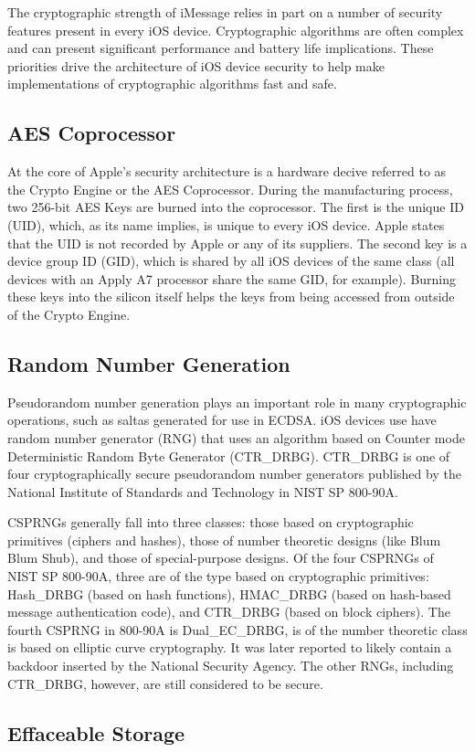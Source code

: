 The cryptographic strength of iMessage relies in part on a number of security
features present in every iOS device. Cryptographic algorithms are often
complex and can present significant performance and battery life implications.
These priorities drive the architecture of iOS device security to help make
implementations of cryptographic algorithms fast and safe.

\subsection{AES Coprocessor}
At the core of Apple's security architecture is a hardware decive referred to
as the Crypto Engine or the AES Coprocessor. During the manufacturing process,
two 256-bit AES Keys are burned into the coprocessor. The first is the unique
ID (UID), which, as its name implies, is unique to every iOS device. Apple
states that the UID is not recorded by Apple or any of its
suppliers\cite{apple}. The second key is a device group ID (GID), which is
shared by all iOS devices of the same class (all devices with an Apply A7
processor share the same GID, for example). Burning these keys into the silicon
itself helps the keys from being accessed from outside of the Crypto Engine.

\subsection{Random Number Generation}
Pseudorandom number generation plays an important role in many cryptographic
operations, such as saltas generated for use in ECDSA. iOS devices use have
random number generator (RNG) that uses an algorithm based on Counter mode
Deterministic Random Byte Generator (CTR\_DRBG).  CTR\_DRBG is one of four
cryptographically secure pseudorandom number generators published by the
National Institute of Standards and Technology in NIST SP
800-90A\cite{nistsp80090a}.

CSPRNGs generally fall into three classes: those based on cryptographic
primitives (ciphers and hashes), those of number theoretic designs (like Blum
Blum Shub), and those of special-purpose designs. Of the four CSPRNGs of NIST
SP 800-90A, three are of the type based on cryptographic primitives: Hash\_DRBG
(based on hash functions), HMAC\_DRBG (based on hash-based message
authentication code), and CTR\_DRBG (based on block ciphers). The fourth CSPRNG
in 800-90A is Dual\_EC\_DRBG, is of the number theoretic class is based on
elliptic curve cryptography. It was later reported to likely contain a backdoor
inserted by the National Security Agency\cite{goodin}. The other RNGs,
including CTR\_DRBG, however, are still considered to be secure.

\subsection{Effaceable Storage}
